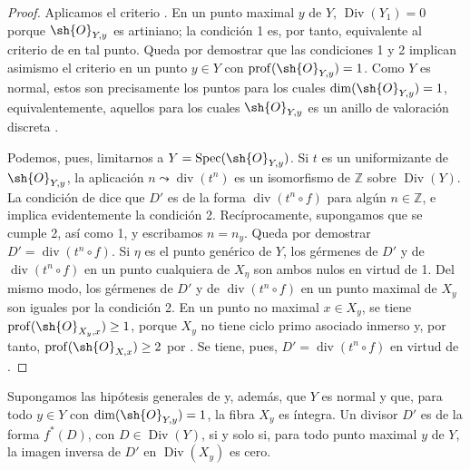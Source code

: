 \begin{proof}
Aplicamos el criterio {}. En un punto maximal $y$ de $Y$,
$\operatorname{Div}(Y_1)=0$ porque $\sh{O}_{Y,y}$ es artiniano;
la condición 1\textdegree{} es, por tanto, equivalente al criterio de
{} en tal punto. Queda por demostrar que las condiciones
1\textdegree{} y 2\textdegree{} implican asimismo el criterio en un
punto $y\in Y$ con $\operatorname{prof}(\sh{O}_{Y,y})=1$. Como $Y$
es normal, estos son precisamente los puntos para los cuales
$\dim(\sh{O}_{Y,y})=1$, equivalentemente, aquellos para los cuales
$\sh{O}_{Y,y}$ es un anillo de valoración discreta {}.

Podemos, pues, limitarnos a $Y=\operatorname{Spec}(\sh{O}_{Y,y})$. Si $t$
es un uniformizante de $\sh{O}_{Y,y}$, la aplicación
$n\leadsto\operatorname{div}(t^n)$ es un isomorfismo de $\mathbb Z$
sobre $\operatorname{Div}(Y)$. La condición de {} dice que
$D'$ es de la forma $\operatorname{div}(t^n\circ f)$ para algún
$n\in\mathbb Z$, e implica evidentemente la condición 2\textdegree{}.
Recíprocamente, supongamos que se cumple 2\textdegree{}, así como 1\textdegree{}, y
escribamos $n=n_y$. Queda por demostrar
$D'=\operatorname{div}(t^n\circ f)$. Si $\eta$ es el punto genérico de
$Y$, los gérmenes de $D'$ y de $\operatorname{div}(t^n\circ f)$ en un punto cualquiera de $X_\eta$ son ambos
nulos en virtud de 1\textdegree{}. Del mismo modo, los gérmenes de $D'$ y de $\operatorname{div}(t^n\circ f)$ en un punto maximal
de $X_y$ son iguales por la condición 2\textdegree{}. En un punto no maximal
$x\in X_y$, se tiene
$\operatorname{prof}(\sh{O}_{X_y,x})\geq1$, porque $X_y$ no tiene
ciclo primo asociado inmerso y, por tanto,
$\operatorname{prof}(\sh{O}_{X,x})\geq2$ por {}. Se tiene, pues, $D'=\operatorname{div}(t^n\circ f)$ en virtud de {}.
\end{proof}

\begin{corollary}[21.4.11]
\ifdefined\EGAIVSuppressErratumLabels\else\label{IV.21.4.11}\fi
Supongamos las hipótesis generales de {} y, además, que
$Y$ es normal y que, para todo $y\in Y$ con
$\dim(\sh{O}_{Y,y})=1$, la fibra $X_y$ es íntegra. Un divisor $D'$ es
de la forma $f^*(D)$, con $D\in\operatorname{Div}(Y)$, si y solo si,
para todo punto maximal $y$ de $Y$, la imagen inversa de $D'$ en
$\operatorname{Div}(X_y)$ es cero.
\end{corollary}

